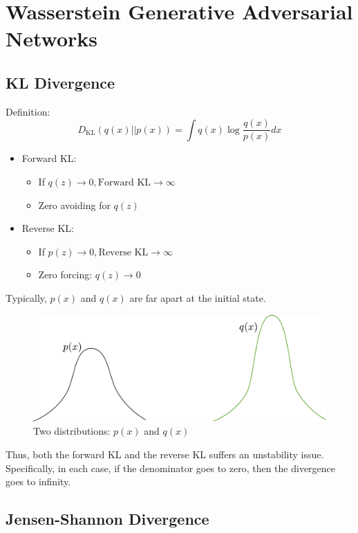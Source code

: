 \section{Wasserstein Generative Adversarial Networks}
\subsection{KL Divergence}
Definition:
$$D_\textrm{KL}(q(x)||p(x)) = \int q(x)\log \frac{q(x)}{p(x)}dx$$
\begin{itemize}
	\item Forward KL: 
	\begin{itemize}
		\item If $q(z)\rightarrow 0, \textrm{Forward KL}\rightarrow \infty$ 
		\item Zero avoiding for $q(z)$ 
	\end{itemize}
	\item Reverse KL:
	\begin{itemize}
		\item If $p(z)\rightarrow 0, \textrm{Reverse KL}\rightarrow \infty$ 
		\item Zero forcing: $q(z)\rightarrow 0$ 
	\end{itemize}
\end{itemize}

Typically, $p(x)$ and $q(x)$ are far apart at the initial state. 

\begin{figure}[h]
	\begin{center}
		\includegraphics[scale=0.5]{./images/generative/gan/twodist.pdf}
	\end{center}
	\caption{Two distributions: $p(x)$ and $q(x)$}
	\label{fig:}
\end{figure}

Thus, both the forward KL and the reverse KL suffers an unstability issue. Specifically, in each case, if the denominator goes to zero, then the divergence goes to infinity. 

\subsection{Jensen-Shannon Divergence}

